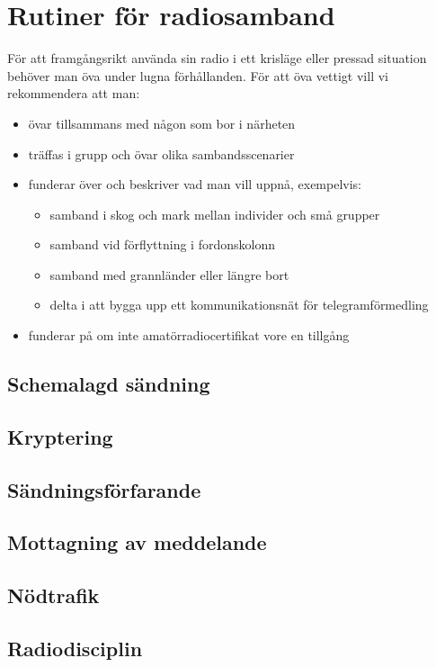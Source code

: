 \chapter{Rutiner för radiosamband}

För att framgångsrikt använda sin radio i ett krisläge eller pressad situation behöver man öva under lugna förhållanden. För att öva vettigt vill vi rekommendera att man:

\begin{itemize}
	\item övar tillsammans med någon som bor i närheten 
	\item träffas i grupp och övar olika sambandsscenarier
	\item funderar över och beskriver vad man vill uppnå, exempelvis:
	\begin{itemize}
		\item samband i skog och mark mellan individer och små grupper
		\item samband vid förflyttning i fordonskolonn
		\item samband med grannländer eller längre bort
		\item delta i att bygga upp ett kommunikationsnät för telegramförmedling
	\end{itemize}
	\item funderar på om inte amatörradiocertifikat vore en tillgång
\end{itemize}

\section{Schemalagd sändning}

\section{Kryptering}

\section{Sändningsförfarande}

\section{Mottagning av meddelande}

\section{Nödtrafik}

\section{Radiodisciplin}
